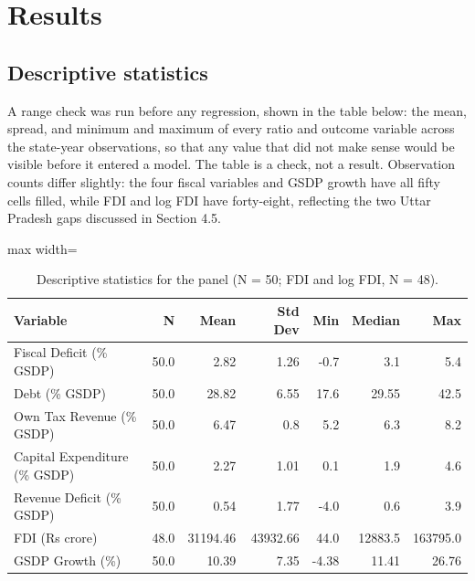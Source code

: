 \documentclass[12pt,a4paper]{article}
\begin{document}
\section{Results}

\subsection{Descriptive statistics}

A range check was run before any regression, shown in the table below: the mean, spread, and minimum and maximum of every ratio and outcome variable across the state-year observations, so that any value that did not make sense would be visible before it entered a model. The table is a check, not a result. Observation counts differ slightly: the four fiscal variables and GSDP growth have all fifty cells filled, while FDI and log FDI have forty-eight, reflecting the two Uttar Pradesh gaps discussed in Section 4.5.

\begin{table}[H]
\centering
\caption{Descriptive statistics for the panel (N = 50; FDI and log FDI, N = 48).}
\label{tab:17}
\footnotesize
\begin{adjustbox}{max width=\textwidth}
\begin{tabular}{@{}lrrrrrr@{}}
\toprule
Variable & N & Mean & Std Dev & Min & Median & Max \\
\midrule
Fiscal Deficit (\% GSDP) & 50.0 & 2.82 & 1.26 & -0.7 & 3.1 & 5.4 \\
Debt (\% GSDP) & 50.0 & 28.82 & 6.55 & 17.6 & 29.55 & 42.5 \\
Own Tax Revenue (\% GSDP) & 50.0 & 6.47 & 0.8 & 5.2 & 6.3 & 8.2 \\
Capital Expenditure (\% GSDP) & 50.0 & 2.27 & 1.01 & 0.1 & 1.9 & 4.6 \\
Revenue Deficit (\% GSDP) & 50.0 & 0.54 & 1.77 & -4.0 & 0.6 & 3.9 \\
FDI (Rs crore) & 48.0 & 31194.46 & 43932.66 & 44.0 & 12883.5 & 163795.0 \\
GSDP Growth (\%) & 50.0 & 10.39 & 7.35 & -4.38 & 11.41 & 26.76 \\
\bottomrule
\end{tabular}
\end{adjustbox}
\end{table}
\end{document}

